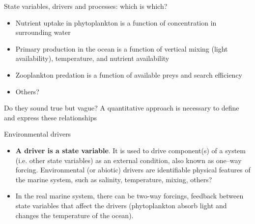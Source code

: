 \documentclass[english,aspectratio=169]{beamer}
\begin{document}
\begin{frame}{State variables, drivers and processes: which is which?}
\begin{itemize}
\item Nutrient uptake in phytoplankton is a function of concentration in surrounding water
\item Primary production in the ocean is a function of vertical mixing (light availability), temperature, and nutrient availability
\item Zooplankton predation is a function of available preys and search efficiency
\item Others?
\end{itemize}
\begin{alertblock}{Do they sound true but vague?}
A quantitative approach is necessary to define and express these relationships
\end{alertblock}
\end{frame}

\begin{frame}{Environmental drivers}
\begin{itemize}
    \item \textbf{A driver is a state variable}. It is used to drive component(s) of a system (i.e. other state variables) as an external condition, also known as one--way forcing. Environmental (or abiotic) drivers are identifiable physical features of the marine system, such as salinity, temperature, mixing, others?
    \item In the real marine system, there can be two-way forcings, feedback between state variables that affect the drivers (phytoplankton absorb light and changes the temperature of the ocean).   
\end{itemize} 
\end{frame}
\end{document}

